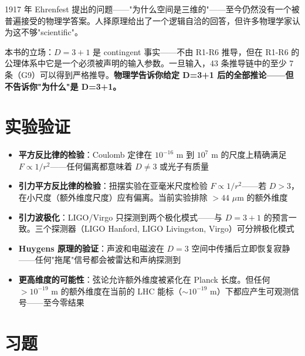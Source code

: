 \begin{insightbox}
  1917 年 Ehrenfest 提出的问题——"为什么空间是三维的"——至今仍然没有一个被普遍接受的物理学答案。人择原理给出了一个逻辑自洽的回答，但许多物理学家认为这不够"scientific"。

  本书的立场：$D=3+1$ 是 contingent 事实——不由 R1-R6 推导，但在 R1-R6 的公理体系中它是一个必须被声明的输入参数。一旦输入，43 条推导链中的至少 7 条（G9）可以得到严格推导。\textbf{物理学告诉你给定 D=3+1 后的全部推论——但不告诉你"为什么"是 D=3+1。}
\end{insightbox}

\section*{实验验证}

\begin{oombox}[D=3+1 的实验验证——我们怎么知道空间正好是三维？]
  \begin{itemize}
    \item \textbf{平方反比律的检验}：Coulomb 定律在 $10^{-16}$ m 到 $10^7$ m 的尺度上精确满足 $F\propto 1/r^2$——任何偏离都意味着 $D\neq3$ 或光子有质量
    \item \textbf{引力平方反比律的检验}：扭摆实验在亚毫米尺度检验 $F\propto 1/r^2$——若 $D>3$，在小尺度（额外维度尺度）应有偏离。当前实验排除 $>44$ $\mu$m 的额外维度
    \item \textbf{引力波极化}：LIGO/Virgo 只探测到两个极化模式——与 $D=3+1$ 的预言一致。三个探测器（LIGO Hanford, LIGO Livingston, Virgo）可分辨极化模式
    \item \textbf{Huygens 原理的验证}：声波和电磁波在 $D=3$ 空间中传播后立即恢复寂静——任何"拖尾"信号都会被雷达和声纳探测到
    \item \textbf{更高维度的可能性}：弦论允许额外维度被紧化在 Planck 长度。但任何 $> 10^{-19}$ m 的额外维度在当前的 LHC 能标（$\sim 10^{-19}$ m）下都应产生可观测信号——至今零结果
  \end{itemize}
\end{oombox}

\section*{习题}

